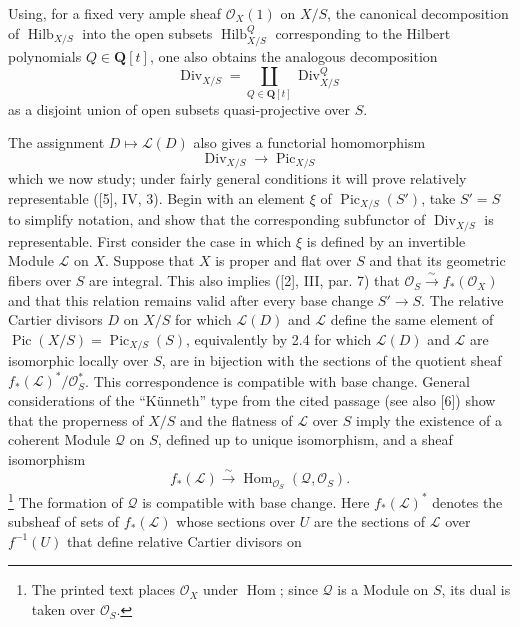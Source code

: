 Using, for a fixed very ample sheaf $\mathcal O_X(1)$ on $X/S$, the canonical
decomposition of $\operatorname{Hilb}_{X/S}$ into the open subsets
$\operatorname{Hilb}^{Q}_{X/S}$ corresponding to the Hilbert polynomials
$Q\in\mathbf Q[t]$, one also obtains the analogous decomposition
\[
\operatorname{Div}_{X/S}=
\coprod_{Q\in\mathbf Q[t]}\operatorname{Div}^{Q}_{X/S}
\]
as a disjoint union of open subsets quasi-projective over $S$.

The assignment $D\longmapsto\mathcal L(D)$ also gives a functorial
homomorphism
\begin{equation}
\operatorname{Div}_{X/S}\longrightarrow\operatorname{Pic}_{X/S}
\tag{+}
\end{equation}
which we now study; under fairly general conditions it will prove relatively
representable ([5], IV, 3). Begin with an element $\xi$ of
$\operatorname{Pic}_{X/S}(S')$, take $S'=S$ to simplify notation, and show that
the corresponding subfunctor of $\operatorname{Div}_{X/S}$ is representable.
First consider the case in which $\xi$ is defined by an invertible Module
$\mathcal L$ on $X$. Suppose that $X$ is proper and flat over $S$ and that its
geometric fibers over $S$ are integral. This also implies ([2], III, par. 7)
that $\mathcal O_S\xrightarrow{\sim}f_*(\mathcal O_X)$ and that this relation
remains valid after every base change $S'\longrightarrow S$. The relative
Cartier divisors $D$ on $X/S$ for which $\mathcal L(D)$ and $\mathcal L$ define
the same element of
$\operatorname{Pic}(X/S)=\operatorname{Pic}_{X/S}(S)$, equivalently by 2.4 for
which $\mathcal L(D)$ and $\mathcal L$ are isomorphic locally over $S$, are in
bijection with the sections of the quotient sheaf
$f_*(\mathcal L)^*/\mathcal O_S^*$. This correspondence is compatible with
base change. General considerations of the “Künneth” type from the cited
passage (see also [6]) show that the properness of $X/S$ and the flatness of
$\mathcal L$ over $S$ imply the existence of a coherent Module $\mathcal Q$ on
$S$, defined up to unique isomorphism, and a sheaf isomorphism
\[
f_*(\mathcal L)\xrightarrow{\sim}
\operatorname{Hom}_{\mathcal O_S}(\mathcal Q,\mathcal O_S).
\]
\footnote{The printed text places $\mathcal O_X$ under
$\operatorname{Hom}$; since $\mathcal Q$ is a Module on $S$, its dual is taken
over $\mathcal O_S$.} The formation of $\mathcal Q$ is compatible with base
change. Here $f_*(\mathcal L)^*$ denotes the subsheaf of sets of
$f_*(\mathcal L)$ whose sections over $U$ are the sections of $\mathcal L$ over
$f^{-1}(U)$ that define relative Cartier divisors on

